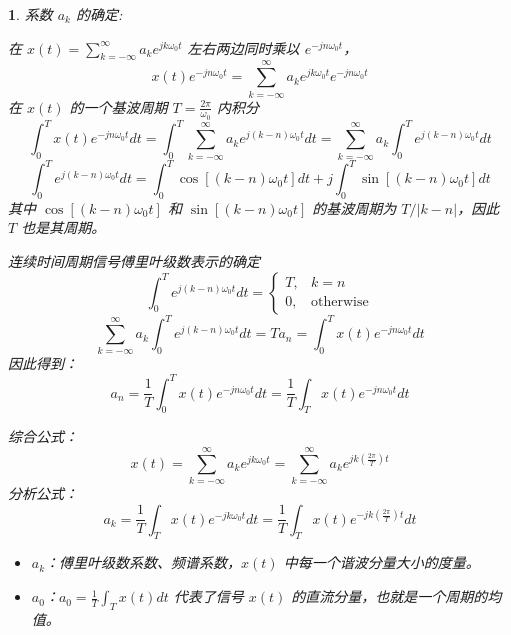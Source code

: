 \documentclass[UTF8]{report}
\theoremstyle{MyLineTheoremStyle} %
\theoremstyle{MyBlockTheoremStyle} %
\theoremstyle{MySubsubsectionStyle} %
\newtheorem{definition}{}
\begin{document}
\begin{definition}
    系数 $a_k$ 的确定:\par
    在 $x(t) = \sum_{k=-\infty}^{\infty} a_k e^{jk\omega_0 t}$ 左右两边同时乘以 $e^{-jn\omega_0 t}$，
    \[
    x(t) e^{-jn\omega_0 t} = \sum_{k=-\infty}^{\infty} a_k e^{jk\omega_0 t} e^{-jn\omega_0 t}
    \]
    在 $x(t)$ 的一个基波周期 $T = \frac{2\pi}{\omega_0}$ 内积分
    \[
    \int_{0}^{T} x(t) e^{-jn\omega_0 t} dt = \int_{0}^{T} \sum_{k=-\infty}^{\infty} a_k e^{j(k-n)\omega_0 t} dt = \sum_{k=-\infty}^{\infty} a_k \int_{0}^{T} e^{j(k-n)\omega_0 t} dt
    \]
    \[
    \int_{0}^{T} e^{j(k-n)\omega_0 t} dt = \int_{0}^{T} \cos[(k-n)\omega_0 t] dt + j \int_{0}^{T} \sin[(k-n)\omega_0 t] dt
    \]
    其中 $\cos[(k-n)\omega_0 t]$ 和 $\sin[(k-n)\omega_0 t]$ 的基波周期为 $T/|k-n|$，因此 $T$ 也是其周期。

    连续时间周期信号傅里叶级数表示的确定
    \[
    \int_{0}^{T} e^{j(k-n)\omega_0 t} dt = \begin{cases}
    T, & k = n \\
    0, & \text{otherwise}
    \end{cases}
    \]
    \[
    \sum_{k=-\infty}^{\infty} a_k \int_{0}^{T} e^{j(k-n)\omega_0 t} dt = Ta_n = \int_{0}^{T} x(t) e^{-jn\omega_0 t} dt
    \]
    因此得到：
    \[
    a_n = \frac{1}{T} \int_{0}^{T} x(t) e^{-jn\omega_0 t} dt = \frac{1}{T} \int_{T} x(t) e^{-jn\omega_0 t} dt
    \]

    综合公式：
    \[
    x(t) = \sum_{k=-\infty}^{\infty} a_k e^{jk\omega_0 t} = \sum_{k=-\infty}^{\infty} a_k e^{jk\left(\frac{2\pi}{T}\right)t}
    \]
    分析公式：
    \[
    a_k = \frac{1}{T} \int_{T} x(t) e^{-jk\omega_0 t} dt = \frac{1}{T} \int_{T} x(t) e^{-jk\left(\frac{2\pi}{T}\right)t} dt
    \]
    \begin{itemize}
    \item $a_k$：傅里叶级数系数、频谱系数，$x(t)$ 中每一个谐波分量大小的度量。\par
    \item $a_0$：$a_0 = \frac{1}{T} \int_{T} x(t) dt$ 代表了信号 $x(t)$ 的直流分量，也就是一个周期的均值。
    \end{itemize}
\end{definition}
\end{document}
